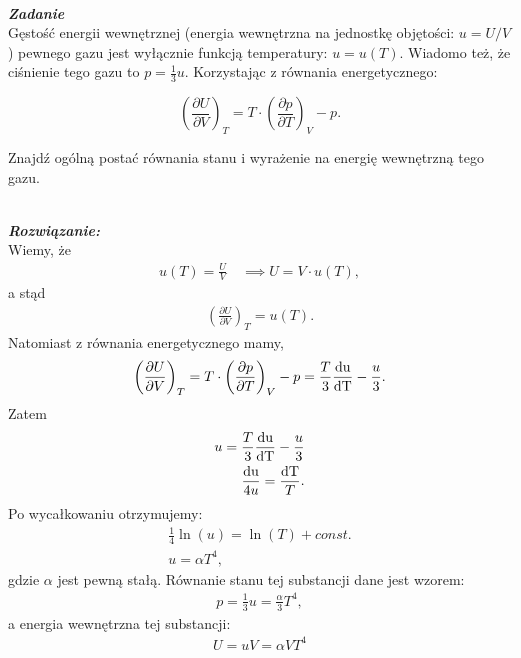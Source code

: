 \documentclass[11pt,a4paper]{article}
\newcounter{zadanie}\newcommand{\zadanie}[1][]{\addtocounter{zadanie}{1} ~\\  {\bf \emph{Zadanie \arabic{zadanie} #1 }} \\}
\newcounter{rozwiazanie}\newcommand{\rozwiazanie}[1][]{\addtocounter{rozwiazanie}{1} ~\\  {\bf \emph{Rozwiązanie: }} \\}
\begin{document}
 
\newpage
\zadanie
Gęstość energii wewnętrznej (energia wewnętrzna na jednostkę objętości: $u = U/V$) pewnego gazu jest 
wyłącznie funkcją temperatury: $u = u(T)$. Wiadomo też, że ciśnienie tego gazu to $p=\frac{1}{3}u$. 
Korzystając z równania energetycznego: 

\[ \left(\frac{\partial U}{\partial V}\right)_T = 
   T \cdot \left(\frac{\partial p}{\partial T}\right)_V - p.\]

Znajdź ogólną postać równania stanu i wyrażenie na energię wewnętrzną tego gazu.

\vspace{5mm}
\rozwiazanie
Wiemy, że
\begin{align}
u(T) = \frac{U}{V} \quad  \implies U = V \cdot u(T),
\end{align}
a stąd 
\begin{align}
\left( \frac{\partial U }{\partial V}\right)_T = u(T). \label{eq:part1}
\end{align}
Natomiast z równania energetycznego mamy,
\begin{align}
\left( \frac{\partial U }{\partial V}\right)_T  = T \cdot \left( \frac{\partial p }{\partial T}\right)_V - p = \frac{T}{3} \frac{\rm{d} u}{\rm{d} T}- \frac{u}{3}. \label{eq:part2}
\end{align}
Zatem 
\begin{align}
u = \frac{T}{3}\frac{\rm{d} u}{\rm{d} T}- \frac{u}{3}\\
\frac{\rm{d}u}{4 u} = \frac{\rm{d}T}{T}.
\end{align}
Po wycałkowaniu otrzymujemy:
\begin{align}
\frac{1}{4}\ln(u) = \ln(T) + const.\\
u = \alpha T^4,
\end{align}
gdzie $\alpha$ jest pewną stałą. 
Równanie stanu tej substancji dane jest wzorem:
\begin{align}
p = \frac{1}{3}u = \frac{\alpha}{3}T^4,
\end{align}
a energia wewnętrzna tej substancji:
\begin{align}
U = u V = \alpha V T^4
\end{align}
\end{document}
